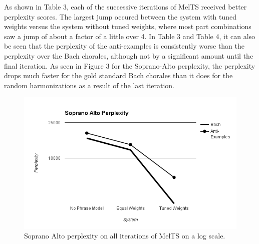 \documentclass{sig-alternate}
\begin{document}
As shown in Table 3, each of the successive iterations of MelTS received better perplexity scores. The largest jump occured between the system with tuned weights versus the system without tuned weights, where most part combinations saw a jump of about a factor of a little over 4. In Table 3 and Table 4, it can also be seen that the perplexity of the anti-examples is consistently worse than the perplexity over the Bach chorales, although not by a significant amount until the final iteration. As seen in Figure 3 for the Soprano-Alto perplexity, the perplexity drops much faster for the gold standard Bach chorales than it does for the random harmonizations as a result of the last iteration.  

\begin{figure}
  \includegraphics[scale=0.5]{soprano_alto_perplexity}
  \caption{Soprano Alto perplexity on all iterations of MelTS on a log scale.}
\end{figure}
\end{document}
